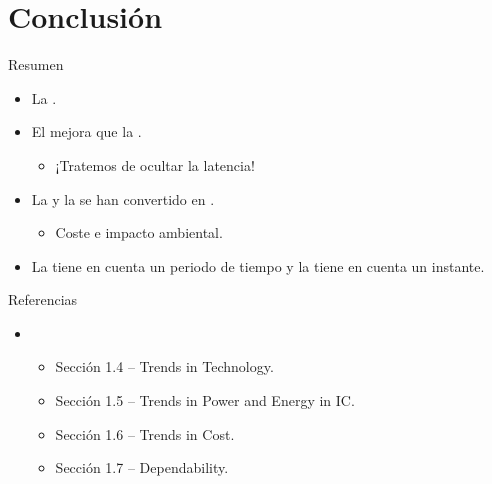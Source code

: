\section{Conclusión}

\begin{frame}[t]{Resumen}
\begin{itemize}
  \item La  .

  \item El  mejora  
        que la .
    \begin{itemize}
      \item ¡Tratemos de ocultar la latencia!
    \end{itemize}

  \item La  y la  se han convertido en
        .
    \begin{itemize}
      \item Coste e impacto ambiental.
    \end{itemize}

  \item La  tiene en cuenta un periodo de tiempo
        y la  tiene en cuenta un instante.
\end{itemize}
\end{frame}

\begin{frame}[t]{Referencias}
\begin{itemize}
  \item \credithennessy
    \begin{itemize}
      \item Sección 1.4 -- Trends in Technology.
      \item Sección 1.5 -- Trends in Power and Energy in IC.
      \item Sección 1.6 -- Trends in Cost.
      \item Sección 1.7 -- Dependability.
    \end{itemize}
\end{itemize}
\end{frame}
